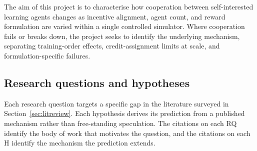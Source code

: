 The aim of this project is to characterise how cooperation between self-interested learning agents changes as incentive alignment, agent count, and reward formulation are varied within a single controlled simulator. Where cooperation fails or breaks down, the project seeks to identify the underlying mechanism, separating training-order effects, credit-assignment limits at scale, and formulation-specific failures.

\subsection{Research questions and hypotheses}
\label{sec:research-questions}

Each research question targets a specific gap in the literature surveyed in Section~\ref{sec:litreview}. Each hypothesis derives its prediction from a published mechanism rather than free-standing speculation. The citations on each RQ identify the body of work that motivates the question, and the citations on each H identify the mechanism the prediction extends.

